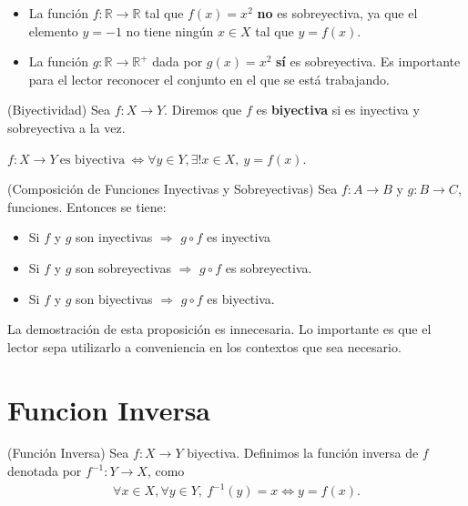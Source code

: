 \documentclass[12pt]{book}
\begin{document}
\begin{eje}{}{}
    \begin{itemize}
        \item La función $f : \mathbb{R} \to \mathbb{R}$ tal que $f(x)=x^2$ \textbf{no} es sobreyectiva, ya que el elemento $y=-1$ no tiene ningún $x \in X$ tal que $y=f(x)$.

        \item La función $g: \mathbb{R} \to \mathbb{R}^+$ dada por $g(x)=x^2$ \textbf{sí} es sobreyectiva. Es importante para el lector reconocer el conjunto en el que se está trabajando.
    \end{itemize}
\end{eje}

\begin{defi}{(Biyectividad)}{}
Sea $f : X \longrightarrow Y $. Diremos que $f$ es \textbf{biyectiva} si es inyectiva y sobreyectiva a la vez.
\end{defi}

\begin{prop}{}{}
  \hspace{4cm}  $ f : X \longrightarrow Y \ \text{es biyectiva} \ \Longleftrightarrow \forall y \in Y, \exists! x \in X, \ y=f(x).$
\end{prop}

\begin{prop}{(Composición de Funciones Inyectivas y Sobreyectivas)}{}
    Sea $f : A \longrightarrow B$ y $g : B \longrightarrow C$, funciones. Entonces se tiene:
    \begin{itemize}
        \item Si $f$ y $g$ son inyectivas $\Longrightarrow$ $g \circ f$ es inyectiva

        \item Si $f$ y $g$ son sobreyectivas $\Longrightarrow$ $g \circ f$ es sobreyectiva.

        \item Si $f$ y $g$ son biyectivas $\Longrightarrow$ $g \circ f$ es biyectiva.
    \end{itemize}
\end{prop}
La demostración de esta proposición es innecesaria. Lo importante es que el lector sepa utilizarlo a conveniencia en los contextos que sea necesario.

\section{Funcion Inversa}
\begin{defi}{(Función Inversa)}{}
    Sea $f : X \longrightarrow Y$ biyectiva. Definimos la función inversa de $f$ denotada por $f^{-1} : Y \longrightarrow X$, como 
    \begin{align*}
        \forall x \in X , \forall y \in Y, \ f^{-1}(y)=x \Longleftrightarrow y =f(x).
    \end{align*}
\end{defi}
\end{document}
